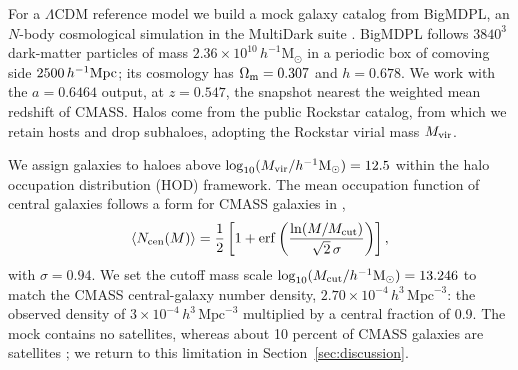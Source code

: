 \documentclass[preprint]{aastex701}
\newcommand{\hinvMpc}{h^{-1}{\rm Mpc}}
\begin{document}
For a $\Lambda$CDM reference model we build a mock galaxy catalog from
BigMDPL, an $N$-body cosmological simulation in the MultiDark suite
\citep{Klypin2016, Riebe2013}. BigMDPL follows $3840^{3}$ dark-matter
particles of mass $2.36\times10^{10}\,h^{-1}\mathrm{M}_{\odot}$ in a periodic
box of comoving side $2500\,\hinvMpc$; its cosmology has
$\Omega_{\rm m}=0.307$ and $h=0.678$. We work with the $a=0.6464$ output, at
$z=0.547$, the snapshot nearest the weighted mean redshift of CMASS. Halos
come from the public Rockstar catalog, from which we retain hosts and drop
subhaloes, adopting the Rockstar virial mass $M_{\rm vir}$. 

We assign galaxies to haloes above $\log_{10}(M_{\rm vir}/h^{-1}\mathrm{M}_{\odot})=12.5$ within the halo occupation distribution (HOD) framework. 
The mean occupation function of central galaxies follows a form for CMASS galaxies in \citet{White2011},
\begin{equation}
  \langle N_{\rm cen}(M)\rangle = \frac{1}{2}\left[1+\mathrm{erf}
  \left(\frac{\ln(M/M_{\rm cut})}{\sqrt{2}\,\sigma}\right)\right],
  \label{eq:hod}
\end{equation}
with $\sigma=0.94$. We set the cutoff mass scale $\log_{10}(M_{\rm cut}/h^{-1}\mathrm{M}_{\odot})=13.246$ to match the CMASS central-galaxy number density,
$2.70\times10^{-4}\,h^{3}\,\mathrm{Mpc}^{-3}$: the observed density of
$3\times10^{-4}\,h^{3}\,\mathrm{Mpc}^{-3}$ multiplied by a central fraction
of 0.9.
The mock contains no satellites, whereas about 10 percent of
CMASS galaxies are satellites \citep{White2011}; we return to this limitation
in Section~\ref{sec:discussion}. 
\end{document}
